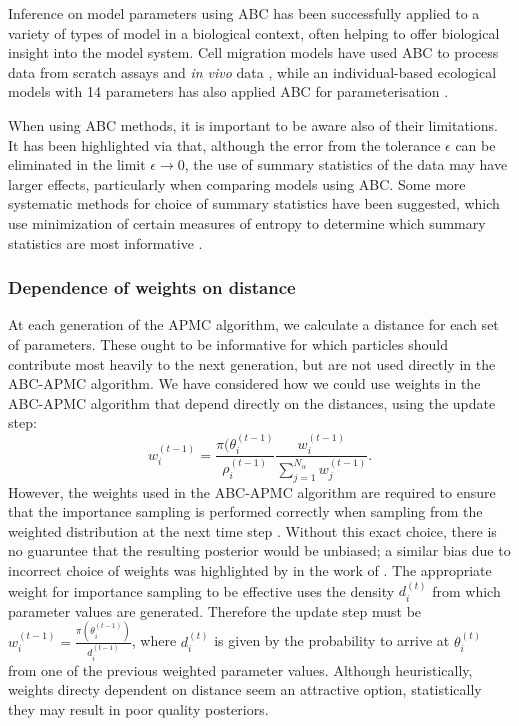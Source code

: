 \documentclass[twocolumn]{biophys}
\begin{document}
Inference on model parameters using ABC has been successfully applied to a variety of types of model in a biological context, often helping to offer biological insight into the model system.
Cell migration models have used ABC to process data from scratch assays \citep{johnston2014interpreting} and \textit{in vivo} data \citep{liepe2012calibrating}, while an individual-based ecological models with 14 parameters has also applied ABC for parameterisation \citep{van2015calibration}. 

When using ABC methods, it is important to be aware also of their limitations. 
It has been highlighted via \citet{robert2011lack} that, although the error from the tolerance $\epsilon$ can be eliminated in the limit $\epsilon \rightarrow 0$, the use of summary statistics of the data may have larger effects, particularly when comparing models using ABC.
Some more systematic methods for choice of summary statistics have been suggested, which use minimization of certain measures of entropy to determine which summary statistics are most informative \citep{nunes2010optimal}.

\subsubsection{Dependence of weights on distance}
At each generation of the APMC algorithm, we calculate a distance for each set of parameters.
These ought to be informative for which particles should contribute most heavily to the next generation, but are not used directly in the ABC-APMC algorithm.
We have considered how we could use weights in the ABC-APMC algorithm that depend directly on the distances, using the update step: 
\begin{equation}
 w_{i}^{(t-1)} = \frac{\pi(\theta_i^{(t-1)}}{\rho_i^{(t-1)}} \frac{ w_i^{(t-1)} }{\sum_{j=1}^{N_{\alpha}} w_j^{(t-1)} }. 
\end{equation}                                                                                                                                                       
However, the weights used in the ABC-APMC algorithm are required to ensure that the importance sampling is performed correctly when sampling from the weighted distribution at the next time step \citep{beaumont2009adaptive}.
Without this exact choice, there is no guaruntee that the resulting posterior would be unbiased; a similar bias due to incorrect choice of weights was highlighted by \citet{beaumont2009adaptive} in the work of \citet{sisson2007sequential}.
The appropriate weight for importance sampling to be effective uses the density $d_i^{(t)}$ from which parameter values are generated.
Therefore the update step must be $w_i^{(t-1)} = \frac{\pi(\theta_i^{(t-1)})}{d_i^{(t-1)}}$, where $d_i^{(t)} $ is given by the probability to arrive at $\theta_i^{(t)}$ from one of the previous weighted parameter values. 
Although heuristically, weights directy dependent on distance seem an attractive option, statistically they may result in poor quality posteriors.
\end{document}

